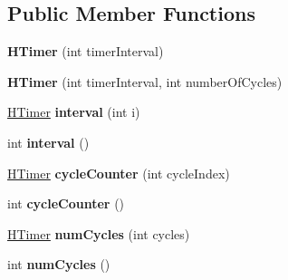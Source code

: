 \subsection*{Public Member Functions}
\begin{DoxyCompactItemize}
\item 
\hypertarget{classhype_1_1trigger_1_1_h_timer_a03dd511f89c5a79f2a9740515a5b175a}{{\bfseries H\-Timer} (int timer\-Interval)}\label{classhype_1_1trigger_1_1_h_timer_a03dd511f89c5a79f2a9740515a5b175a}

\item 
\hypertarget{classhype_1_1trigger_1_1_h_timer_a65a11ba5c1627d57d3063d24025b1c3b}{{\bfseries H\-Timer} (int timer\-Interval, int number\-Of\-Cycles)}\label{classhype_1_1trigger_1_1_h_timer_a65a11ba5c1627d57d3063d24025b1c3b}

\item 
\hypertarget{classhype_1_1trigger_1_1_h_timer_a972f8c8b8679668854c50920a23c0598}{\hyperlink{classhype_1_1trigger_1_1_h_timer}{H\-Timer} {\bfseries interval} (int i)}\label{classhype_1_1trigger_1_1_h_timer_a972f8c8b8679668854c50920a23c0598}

\item 
\hypertarget{classhype_1_1trigger_1_1_h_timer_a0df71d324eb5f91fc2d94dfabac1da87}{int {\bfseries interval} ()}\label{classhype_1_1trigger_1_1_h_timer_a0df71d324eb5f91fc2d94dfabac1da87}

\item 
\hypertarget{classhype_1_1trigger_1_1_h_timer_a48f5134bc4c528654b67426757cf63f1}{\hyperlink{classhype_1_1trigger_1_1_h_timer}{H\-Timer} {\bfseries cycle\-Counter} (int cycle\-Index)}\label{classhype_1_1trigger_1_1_h_timer_a48f5134bc4c528654b67426757cf63f1}

\item 
\hypertarget{classhype_1_1trigger_1_1_h_timer_aeffb6653e223d608bf75ffe89699f1a5}{int {\bfseries cycle\-Counter} ()}\label{classhype_1_1trigger_1_1_h_timer_aeffb6653e223d608bf75ffe89699f1a5}

\item 
\hypertarget{classhype_1_1trigger_1_1_h_timer_a2de07d87e3226301f7dd0d019b03155c}{\hyperlink{classhype_1_1trigger_1_1_h_timer}{H\-Timer} {\bfseries num\-Cycles} (int cycles)}\label{classhype_1_1trigger_1_1_h_timer_a2de07d87e3226301f7dd0d019b03155c}

\item 
\hypertarget{classhype_1_1trigger_1_1_h_timer_a03c261afea8e3bff9c2b8dbacf6e8f19}{int {\bfseries num\-Cycles} ()}\label{classhype_1_1trigger_1_1_h_timer_a03c261afea8e3bff9c2b8dbacf6e8f19}


\end{DoxyCompactItemize}

